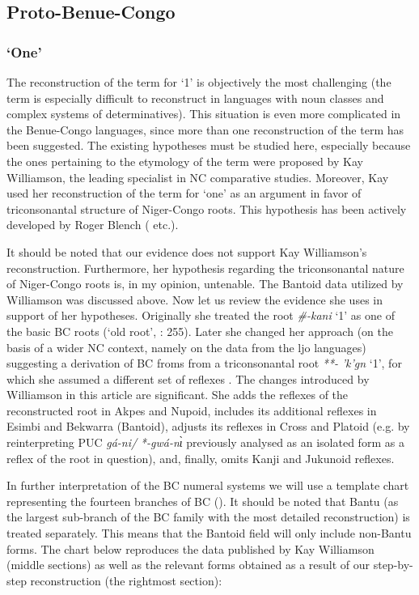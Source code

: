 \subsection{Proto-Benue-Congo}\label{sec:3.1.4}
\subsubsection{‘One’}\label{sec:3.1.4.1}
The reconstruction of the term for ‘1’ is objectively the most challenging (the term is especially difficult to reconstruct in languages with noun classes and complex systems of determinatives). This situation is even more complicated in the Benue-Congo languages, since more than one reconstruction of the term has been suggested. The existing hypotheses must be studied here, especially because the ones pertaining to the etymology of the term were proposed by Kay Williamson, the leading specialist in NC comparative studies. Moreover, Kay \citet{Williamson1989b} used her reconstruction of the term for ‘one’ as an argument in favor of triconsonantal structure of Niger-Congo roots. This hypothesis has been actively developed by Roger Blench (\citeyear*{Blench2012a} etc.). 

It should be noted that our evidence does not support Kay Williamson’s reconstruction. Furthermore, her hypothesis regarding the triconsonantal nature of Niger-Congo roots is, in my opinion, untenable. The Bantoid data utilized by Williamson was discussed above. Now let us review the evidence she uses in support of her hypotheses. Originally she treated the root \textit{\#-kani} ‘1’ as one of the basic BC roots (‘old root’, \citealt{Williamson1989b}: 255). Later she changed her approach (on the basis of a wider NC context, namely on the data from the ljo languages) suggesting a derivation of BC froms from a triconsonantal root \textit{**-} \textit{'k{}'g{}n{}} ‘1’, for which she assumed a different set of reflexes \citep[396]{Williamson1992}. The changes introduced by Williamson in this article are significant. She adds the reflexes of the reconstructed root in Akpes and Nupoid, includes its additional reflexes in Esimbi and Bekwarra (Bantoid), adjusts its reflexes in Cross and Platoid (e.g. by reinterpreting PUC \textit{gá-ni/} \textit{*-gwá-n{\`{ɩ}}} previously analysed as an isolated form as a reflex of the root in question), and, finally, omits Kanji and Jukunoid reflexes.

In further interpretation of the BC numeral systems we will use a template chart representing the fourteen branches of BC (). It should be noted that Bantu (as the largest sub-branch of the BC family with the most detailed reconstruction) is treated separately. This means that the Bantoid field will only include non-Bantu forms. The chart below reproduces the data published by Kay Williamson (middle sections) as well as the relevant forms obtained as a result of our step-by-step reconstruction (the rightmost section):

